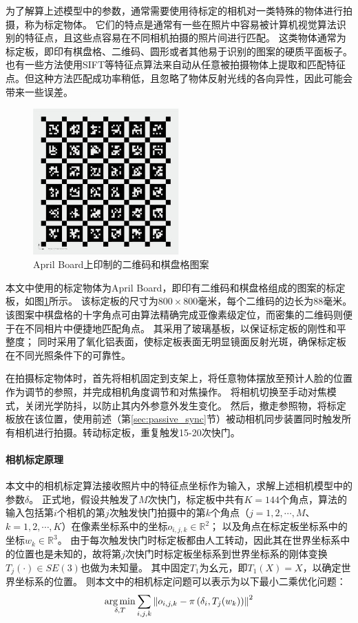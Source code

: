 为了解算上述模型中的参数，通常需要使用待标定的相机对一类特殊的物体进行拍摄，称为标定物体。
它们的特点是通常有一些在照片中容易被计算机视觉算法识别的特征点，且这些点容易在不同相机拍摄的照片间进行匹配。
这类物体通常为标定板，即印有棋盘格、二维码、圆形或者其他易于识别的图案的硬质平面板子。
也有一些方法\cite{colmap}使用SIFT等特征点算法来自动从任意被拍摄物体上提取和匹配特征点。但这种方法匹配成功率稍低，且忽略了物体反射光线的各向异性，因此可能会带来一些误差。

\begin{figure}
    \centering
    \includegraphics[width=0.5\textwidth]{figures/april_board}
    \caption{April Board上印制的二维码和棋盘格图案}
    \label{fig:april_board}
\end{figure}

本文中使用的标定物体为April Board，即印有二维码和棋盘格组成的图案的标定板，如图\ref{fig:april_board}所示。
该标定板的尺寸为$800 \times 800$毫米，每个二维码的边长为$88$毫米。
该图案中棋盘格的十字角点可由算法精确完成亚像素级定位，而密集的二维码则便于在不同相片中便捷地匹配角点。
其采用了玻璃基板，以保证标定板的刚性和平整度；
同时采用了氧化铝表面，使标定板表面无明显镜面反射光斑，确保标定板在不同光照条件下的可靠性。

在拍摄标定物体时，首先将相机固定到支架上，将任意物体摆放至预计人脸的位置作为调节的参照，并完成相机角度调节和对焦操作。
将相机切换至手动对焦模式，关闭光学防抖，以防止其内外参意外发生变化。
然后，撤走参照物，将标定板放在该位置，使用前述（第\ref{sec:passive_sync}节）被动相机同步装置同时触发所有相机进行拍摄。转动标定板，重复触发15-20次快门。

\paragraph{相机标定原理}本文中的相机标定算法接收照片中的特征点坐标作为输入，求解上述相机模型中的参数$\delta$。
正式地，假设共触发了$M$次快门，标定板中共有$K=144$个角点，算法的输入包括第$i$个相机的第$j$次触发快门拍摄中的第$k$个角点（$j = 1,2,\cdots,M$、$k = 1,2,\cdots,K$）在像素坐标系中的坐标$o_{i,j,k}\in \mathbb{R}^2$；
以及角点在标定板坐标系中的坐标$w_k\in \mathbb{R}^3$。
由于每次触发快门时标定板都由人工转动，因此其在世界坐标系中的位置也是未知的，故将第$j$次快门时标定板坐标系到世界坐标系的刚体变换$T_{j}(\cdot)\in SE(3)$也做为未知量。
其中固定$T_{1}$为幺元，即$T_{1}(X) = X$，以确定世界坐标系的位置。
则本文中的相机标定问题可以表示为以下最小二乘优化问题：
\begin{equation}
    \label{eq:calib_opt}
    \operatorname*{arg\,min}_{\delta,T} \sum_{i,j,k} \left\| o_{i,j,k} - \pi\left(\delta_i, T_j(w_k)\right) \right\|^2
\end{equation}

